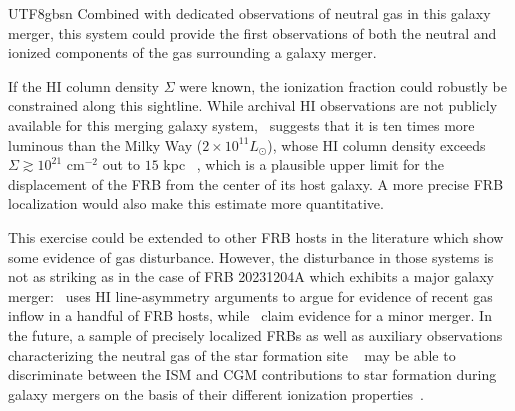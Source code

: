 \documentclass[twocolumn,linenumbers]{aastex631}
\begin{document}
\begin{CJK*}{UTF8}{gbsn}
Combined with dedicated observations of neutral gas in this galaxy merger, this system could provide the first observations of both the neutral and ionized components of the gas surrounding a galaxy merger.

If the HI column density $\Sigma$ were known, the ionization fraction could robustly be constrained along this sightline. While archival HI observations are not publicly available for this merging galaxy system,~\citet{tempel2014flux} suggests that it is ten times more luminous than the Milky Way ($2 \times 10^{11} L_\odot$), whose HI column density exceeds $\Sigma \gtrsim 10^{21}$ cm$^{-2}$ out to $15$ kpc ~\citep{kalberla2009hi}, which is a plausible upper limit for the displacement of the FRB from the center of its host galaxy. A more precise FRB localization would also make this estimate more quantitative.

This exercise could be extended to other FRB hosts in the literature which show some evidence of gas disturbance. However, the disturbance in those systems is not as striking as in the case of FRB 20231204A which exhibits a major galaxy merger:~\citet{michalowski2021asymmetric} uses HI line-asymmetry arguments to argue for evidence of recent gas inflow in a handful of FRB hosts, while~\citet{kaur2022fast} claim evidence for a minor merger. In the future, a sample of precisely localized FRBs as well as auxiliary observations characterizing the neutral gas of the star formation site ~\citep[e.g., ][]{leewadell2023host,yamanaka2024alma,glowacki2023wallaby} may be able to discriminate between the ISM and CGM contributions to star formation during galaxy mergers on the basis of their different ionization properties~\citep{sparre2023gas}.


\end{CJK*}
\end{document}
